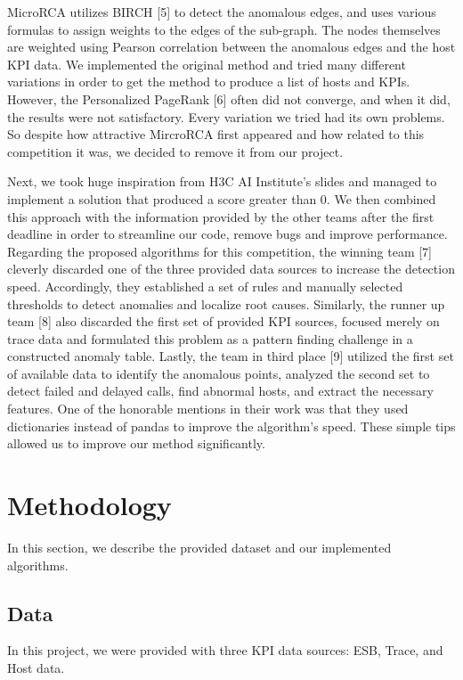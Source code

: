 \documentclass[12pt]{article}
\begin{document}
\vspace{-0.3cm}
\noindent MicroRCA utilizes BIRCH [5] to detect the anomalous edges, and uses various formulas to assign weights to the edges of the sub-graph. The nodes themselves are weighted using Pearson correlation between the anomalous edges and the host KPI data. We implemented the original method and tried many different variations in order to get the method to produce a list of hosts and KPIs. However, the Personalized PageRank [6] often did not converge, and when it did, the results were not satisfactory. Every variation we tried had its own problems. So despite how attractive MircroRCA first appeared and how related to this competition it was, we decided to remove it from our project.

\noindent Next, we took huge inspiration from H3C AI Institute's slides and managed to implement a solution that produced a score greater than 0. We then combined this approach with the information provided by the other teams after the first deadline in order to streamline our code, remove bugs and improve performance. Regarding the proposed algorithms for this competition, the winning team [7] cleverly discarded one of the three provided data sources to increase the detection speed. Accordingly, they established a set of rules and manually selected thresholds to detect anomalies and localize root causes. Similarly, the runner up team [8] also discarded the first set of provided KPI sources, focused merely on trace data and formulated this problem as a pattern finding challenge in a constructed anomaly table. Lastly, the team in third place [9] utilized the first set of available data to identify the anomalous points, analyzed the second set to detect failed and delayed calls, find abnormal hosts, and extract the necessary features. One of the honorable mentions in their work was that they used dictionaries instead of pandas to improve the algorithm's speed. These simple tips allowed us to improve our method significantly.

\section{Methodology} 
In this section, we describe the provided dataset and our implemented algorithms.

\vspace{-0.2cm}
\subsection{Data}
In this project, we were provided with three KPI data sources: ESB, Trace, and Host data.
\end{document}
